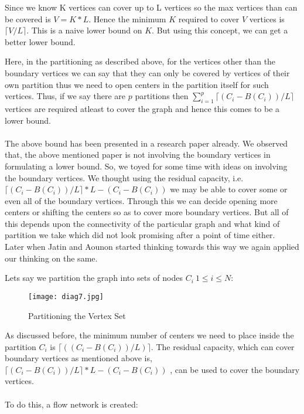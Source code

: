 \documentclass[12pt,a4paper,onecolumn]{article}
\begin{document}
Since we know K vertices can cover up to L vertices so the max vertices than can be covered is $V = K*L$. Hence the minimum $K$ required to cover $V$ vertices is $\lceil V/L\rceil$. This is a naive lower bound on $K$. But using this concept, we can get a better lower bound. 

Here, in the partitioning as described above, for the vertices other than the boundary vertices we can say that they can only be covered by vertices of their own partition thus we need to open centers in the partition itself for such vertices. Thus, if we say there are $p$ partitions then $\sum_{i=1}^{p}\lceil (C_i-B(C_i))/L\rceil$ vertices are required atleast to cover the graph and hence this comes to be a lower bound. \\\\The above bound has been presented in a research paper already. We observed that, the above mentioned paper is not involving the boundary vertices in formulating a lower bound. So, we toyed for some time with ideas on involving the boundary vertices. We thought using the residual capacity, i.e. $\lceil (C_i-B(C_i))/L\rceil*L-(C_i-B(C_i))$ we may be able to cover some or even all of the boundary vertices. Through this we can decide opening more centers or shifting the centers so as to cover more boundary vertices. But all of this depends upon the connectivity of the particular graph and what kind of partition we take which did not look promising after a point of time either.\\ Later when Jatin and Aounon started thinking towards this way we again applied our thinking on the same.

Lets say we partition the graph into sets of nodes $C_i \: 1 \leq i \leq N$:

\begin{flushright}
\begin{figure}[H]
\texttt{[image: diag7.jpg]}
\caption{Partitioning the Vertex Set}
\end{figure}
\end{flushright}

As discussed before, the minimum number of centers we need to place inside the partition $C_i$ is $\lceil ((C_i-B(C_i))/L) \rceil$. The residual capacity, which can cover boundary vertices as mentioned above is,$\lceil (C_i-B(C_i))/L\rceil*L-(C_i-B(C_i))$ , can be used to cover the boundary vertices. 
\\\\
To do this, a flow network is created:
\end{document}
